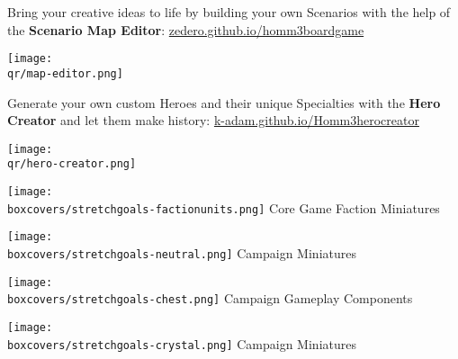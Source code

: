 \begin{multicols}{2}
\begin{itemize}
    \begin{minipage}{5cm}
        \item Bring your creative ideas to life by building your own Scenarios with the help of the \textbf{Scenario Map Editor}:
        {\footnotesize \href{https://zedero.github.io/homm3boardgame/}{zedero.github.io/homm3boardgame}}
    \end{minipage}
    \hfill
    \begin{minipage}{2cm}
        \begin{center}
            \texttt{[image: \\qr/map-editor.png]}
            \scriptsize {}
        \end{center}
    \end{minipage}\par
    \smallskip
    \begin{minipage}{5cm}
    \item Generate your own custom Heroes and their unique Specialties with the \textbf{Hero Creator} and let them make history:
      \mbox{\footnotesize \href{https://k-adam.github.io/Homm3_hero_creator}{k-adam.github.io/Homm3\textunderscore{}hero\textunderscore{}creator}}
    \end{minipage}
    \hfill
    \begin{minipage}{2cm}
        \begin{center}
            \texttt{[image: \\qr/hero-creator.png]}
            \scriptsize {}
        \end{center}
    \end{minipage}\par
  \end{itemize}
\end{multicols}
\begin{multicols}{4}
    \begin{center}
        \texttt{[image: \\boxcovers/stretchgoals-factionunits.png]}\newline
        \footnotesize Core Game Faction Miniatures\par
        \columnbreak
        \texttt{[image: \\boxcovers/stretchgoals-neutral.png]}\newline
        \footnotesize {} Campaign Miniatures\par
        \columnbreak
        \texttt{[image: \\boxcovers/stretchgoals-chest.png]}\newline
        \footnotesize {} Campaign Gameplay Components\par
        \columnbreak
        \texttt{[image: \\boxcovers/stretchgoals-crystal.png]}\newline
        \footnotesize {} Campaign Miniatures\par
    \end{center}
\end{multicols}
